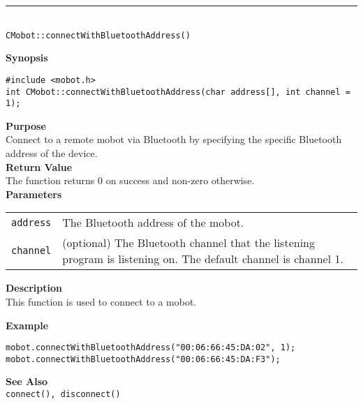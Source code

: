\noindent
\vspace{5pt}
\rule{4.5in}{0.015in} \\
\noindent
{\LARGE \texttt{CMobot::connectWithBluetoothAddress()}}\\
{}

\noindent
{\bf Synopsis}
\vspace{-8pt}
\begin{verbatim}
#include <mobot.h>
int CMobot::connectWithBluetoothAddress(char address[], int channel = 1);
\end{verbatim}

\noindent
{\bf Purpose}\\
Connect to a remote mobot via Bluetooth by specifying the specific Bluetooth
address of the device.\\

\noindent
{\bf Return Value}\\
The function returns 0 on success and non-zero otherwise.\\

\noindent
{\bf Parameters}
\vspace{-0.1in}
\begin{description}
\item               
\begin{tabular}{p{10 mm}p{145 mm}}
\texttt{address} & The Bluetooth address of the mobot. \\
\texttt{channel} & (optional) The Bluetooth channel that the listening program is
listening on. The default channel is channel 1. \\
\end{tabular}
\end{description}

\noindent
{\bf Description}\\
This function is used to connect to a mobot. 

\noindent
{\bf Example}\\
\begin{verbatim}
mobot.connectWithBluetoothAddress("00:06:66:45:DA:02", 1);
mobot.connectWithBluetoothAddress("00:06:66:45:DA:F3");
\end{verbatim}
\noindent

\noindent
{\bf See Also}\\
\texttt{connect(), disconnect()}

